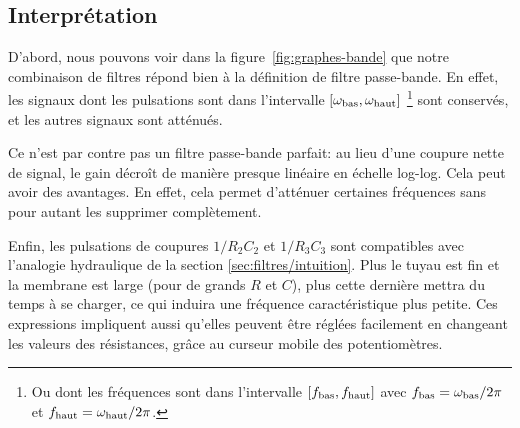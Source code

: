 \subsection{Interprétation}

D'abord, nous pouvons voir dans la figure~\ref{fig:graphes-bande}
que notre combinaison de filtres répond bien à la définition de
filtre passe-bande.
En effet, les signaux dont les pulsations sont dans l'intervalle
$[\omega_{\mathrm{bas}},\omega_{\mathrm{haut}}]$
\footnote{
    Ou dont les fréquences sont dans l'intervalle
    $[f_{\mathrm{bas}},f_{\mathrm{haut}}]$ avec
    $f_{\mathrm{bas}} = \omega_{\mathrm{bas}}/2\pi$ et
    $f_{\mathrm{haut}} = \omega_{\mathrm{haut}}/2\pi$.
}
sont conservés, et les autres signaux sont atténués.

Ce n'est par contre pas un filtre passe-bande parfait:
au lieu d'une coupure nette de signal, le gain décroît
de manière presque linéaire en échelle log-log.
Cela peut avoir des avantages.
En effet, cela permet d'atténuer certaines fréquences sans pour autant
les supprimer complètement.

Enfin, les pulsations de coupures $1/R_2C_2$ et $1/R_3C_3$
sont compatibles avec l'analogie hydraulique de la section
\ref{sec:filtres/intuition}.
Plus le tuyau est fin et la membrane est large (pour de grands $R$ et $C$),
plus cette dernière mettra du temps à se charger,
ce qui induira une fréquence caractéristique plus petite.
Ces expressions impliquent aussi qu'elles
peuvent être réglées facilement en changeant les valeurs des résistances,
grâce au curseur mobile des potentiomètres.
